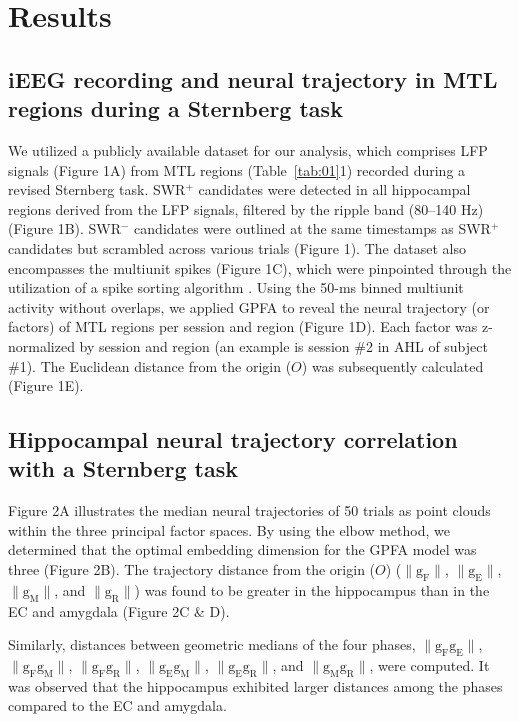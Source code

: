 
\section{Results}
\subsection{iEEG recording and neural trajectory in MTL regions during a Sternberg task}
We utilized a publicly available dataset \cite{boran_dataset_2020} for our analysis, which comprises LFP signals (Figure 1A) from MTL regions (Table~\ref{tab:01}1) recorded during a revised Sternberg task. SWR$^+$ candidates were detected in all hippocampal regions derived from the LFP signals, filtered by the ripple band (80--140 Hz) (Figure 1B). SWR$^-$ candidates were outlined at the same timestamps as SWR$^+$ candidates but scrambled across various trials (Figure 1). The dataset also encompasses the multiunit spikes (Figure 1C), which were pinpointed through the utilization of a spike sorting algorithm \cite{niediek_reliable_2016}. Using the 50-ms binned multiunit activity without overlaps, we applied GPFA \cite{yu_gaussian-process_2009} to reveal the neural trajectory (or factors) of MTL regions per session and region (Figure 1D). Each factor was z-normalized by session and region (an example is session \#2 in AHL of subject \#1). The Euclidean distance from the origin ($O$) was subsequently calculated (Figure 1E).

\subsection{Hippocampal neural trajectory correlation with a Sternberg task}
Figure 2A illustrates the median neural trajectories of 50 trials as point clouds within the three principal factor spaces. By using the elbow method, we determined that the optimal embedding dimension for the GPFA model was three (Figure 2B). The trajectory distance from the origin ($O$) ($\mathrm{\lVert g_{F} \rVert}$, $\mathrm{\lVert g_{E} \rVert}$, $\mathrm{\lVert g_{M} \rVert}$, and $\mathrm{\lVert g_{R} \rVert}$) was found to be greater in the hippocampus than in the EC and amygdala (Figure 2C \& D).

Similarly, distances between geometric medians of the four phases, $\mathrm{\lVert g_{F}g_{E} \rVert}$, $\mathrm{\lVert g_{F}g_{M} \rVert}$, $\mathrm{\lVert g_{F}g_{R} \rVert}$, $\mathrm{\lVert g_{E}g_{M} \rVert}$, $\mathrm{\lVert g_{E}g_{R} \rVert}$, and $\mathrm{\lVert g_{M}g_{R} \rVert}$, were computed. It was observed that the hippocampus exhibited larger distances among the phases compared to the EC and amygdala. 

